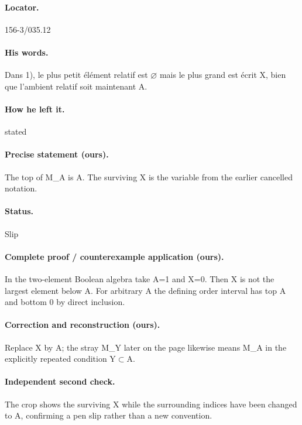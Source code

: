 \paragraph{Locator.} 156-3/035.12

\paragraph{His words.} Dans 1), le plus petit élément relatif est \ensuremath{\varnothing} mais le plus grand est écrit X, bien que l’ambient relatif soit maintenant A.

\paragraph{How he left it.} stated

\paragraph{Precise statement (ours).} The top of M\_A is A. The surviving X is the variable from the earlier cancelled notation.

\paragraph{Status.} Slip

\paragraph{Complete proof / counterexample application (ours).} In the two-element Boolean algebra take A=1 and X=0. Then X is not the largest element below A. For arbitrary A the defining order interval has top A and bottom 0 by direct inclusion.

\paragraph{Correction and reconstruction (ours).} Replace X by A; the stray M\_Y later on the page likewise means M\_A in the explicitly repeated condition Y\ensuremath{\subset}A.

\paragraph{Independent second check.} The crop shows the surviving X while the surrounding indices have been changed to A, confirming a pen slip rather than a new convention.

